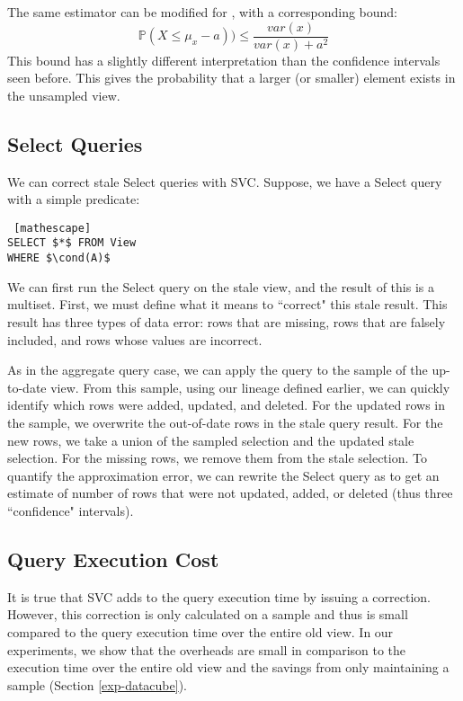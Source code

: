 The same estimator can be modified for \minfunc, with a corresponding bound:
\[
\mathbb{P}(X \le \mu_x - a )) \le \frac{var(x)}{var(x) + a^2}
\]
This bound has a slightly different interpretation than the confidence intervals seen before.
This gives the probability that a larger (or smaller) element exists in the unsampled view.

\subsection{Select Queries}
We can correct stale Select queries with SVC.
Suppose, we have a Select query with a simple predicate:
\begin{lstlisting} [mathescape]
SELECT $*$ FROM View 
WHERE $\cond(A)$
\end{lstlisting}

We can first run the Select query on the stale view, and the result of this is a multiset.
First, we must define what it means to ``correct" this stale result.
This result has three types of data error: rows that are missing, rows that are falsely included, and rows whose values are incorrect.

As in the aggregate query case, we can apply the query to the sample of the up-to-date view.
From this sample, using our lineage defined earlier, we can quickly identify which rows were added, updated, and deleted.
For the updated rows in the sample, we overwrite the out-of-date rows in the stale query result.
For the new rows, we take a union of the sampled selection and the updated stale selection.
For the missing rows, we remove them from the stale selection.
To quantify the approximation error, we can rewrite the Select query as \countfunc to get an estimate of number of rows that were not updated, added, or deleted (thus three ``confidence" intervals). 

\subsection{Query Execution Cost}
It is true that SVC adds to the query execution time by issuing a correction. 
However, this correction is only calculated on a sample and thus is small compared to the query execution time over the entire old view.
In our experiments, we show that the overheads are small in comparison to the execution time over the entire old view and the savings from only maintaining a sample (Section \ref{exp-datacube}).
